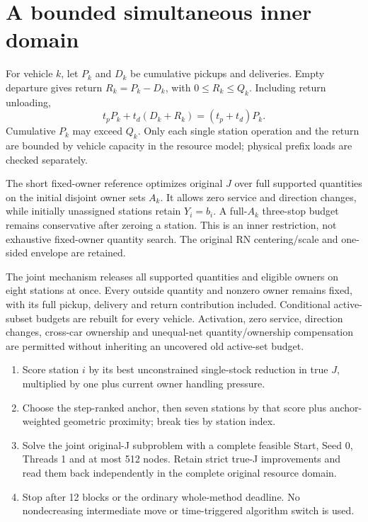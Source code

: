 \documentclass[11pt]{article}
\begin{document}
\section{A bounded simultaneous inner domain}
For vehicle $k$, let $P_k$ and $D_k$ be cumulative pickups and deliveries.
Empty departure gives return $R_k=P_k-D_k$, with $0\le R_k\le Q_k$.
Including return unloading,
\[
 t_pP_k+t_d(D_k+R_k)=(t_p+t_d)P_k.
\]
Cumulative $P_k$ may exceed $Q_k$. Only each single station operation and
the return are bounded by vehicle capacity in the resource model; physical
prefix loads are checked separately.

The short fixed-owner reference optimizes original $J$ over full supported
quantities on the initial disjoint owner sets $A_k$. It allows zero service
and direction changes, while initially unassigned stations retain $Y_i=b_i$.
A full-$A_k$ three-stop budget remains conservative after zeroing a station.
This is an inner restriction, not exhaustive fixed-owner quantity search.
The original RN centering/scale and one-sided envelope are retained.

The joint mechanism releases all supported quantities and eligible owners
on eight stations at once. Every outside quantity and nonzero owner remains
fixed, with its full pickup, delivery and return contribution included.
Conditional active-subset budgets are rebuilt for every vehicle. Activation,
zero service, direction changes, cross-car ownership and unequal-net
quantity/ownership compensation are permitted without inheriting an
uncovered old active-set budget.

\begin{enumerate}
\item Score station $i$ by its best unconstrained single-stock reduction in
true $J$, multiplied by one plus current owner handling pressure.
\item Choose the step-ranked anchor, then seven stations by that score plus
anchor-weighted geometric proximity; break ties by station index.
\item Solve the joint original-J subproblem with a complete feasible Start,
Seed 0, Threads 1 and at most 512 nodes. Retain strict true-J improvements and
read them back independently in the complete original resource domain.
\item Stop after 12 blocks or the ordinary whole-method deadline. No
nondecreasing intermediate move or time-triggered algorithm switch is used.
\end{enumerate}
\end{document}
